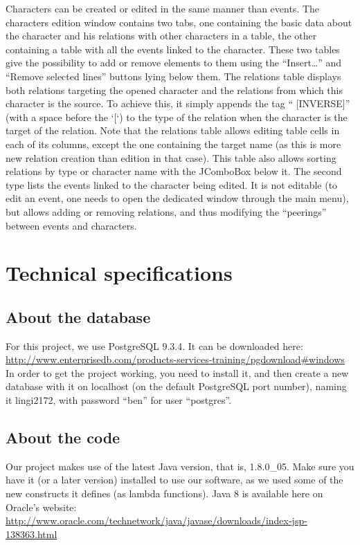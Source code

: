 \documentclass[a4paper ,12pt,french]{article}
\begin{document}
Characters can be created or edited in the same manner than events.
The characters edition window contains two tabs, one containing the basic data about the character and his relations with other characters in a table, the other containing a table with all the events linked to the character. These two tables give the possibility to add or remove elements to them using the “Insert…” and “Remove selected lines” buttons lying below them.
The relations table displays both relations targeting the opened character and the relations from which this character is the source. To achieve this, it simply appends the tag “ [INVERSE]” (with a space before the ‘[‘) to the type of the relation  when the character is the target of the relation.  Note that the relations table allows editing table cells in each of its columns, except the one containing the target name (as this is more new relation creation than edition in that case). This table also allows sorting relations by type or character name with the JComboBox below it. 
The second type lists the events linked to the character being edited. It is not editable (to edit an event, one needs to open the dedicated window through the main menu), but allows adding or removing relations, and thus modifying the “peerings” between events and characters.


\section{Technical specifications }

\subsection{About the database}

For this project, we use PostgreSQL 9.3.4. It can be downloaded here: \url{http://www.enterprisedb.com/products-services-training/pgdownload#windows}
In order to get the project working, you need to install it, and then create a new database with it on localhost (on the default PostgreSQL port number), naming it lingi2172, with password “ben” for user “postgres”.


\subsection{About the code}
Our project makes use of the latest Java version, that is, 1.8.0\_05. Make sure you have it (or a later version) installed to use our software, as we used some of the new constructs it defines (as lambda functions). Java 8 is available here on Oracle’s website: 
\url{http://www.oracle.com/technetwork/java/javase/downloads/index-jsp-138363.html }\\
\end{document}
